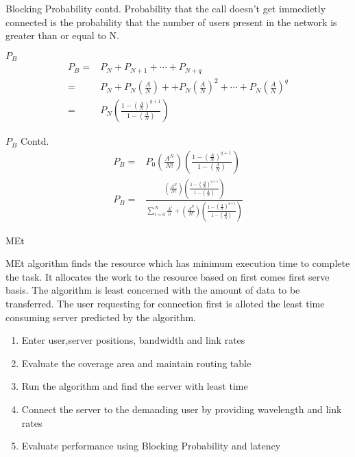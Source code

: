\documentclass{beamer}
\providecommand{\brak}[1]{\ensuremath{\left(#1\right)}}
\begin{document}
\begin{frame}{Blocking Probability contd.}
  Probability that the call doesn't get immedietly connected is the probability that
  the number of users present in the network is greater than or equal to N.
  \begin{block}{$P_B$}
    \begin{align}
      P_B = & P_N + P_{N+1} + \cdots +P_{N+q}                                                              \\[0.2cm]
      =     & P_N + P_N \brak{\frac{A}{N}} + + P_N \brak{\frac{A}{N}}^2 +\cdots + P_N \brak{\frac{A}{N}}^q \\[0.2cm]
      =     & P_N\brak{\frac{1-\brak{\frac{A}{N}}^{q+1}}{1-\brak{\frac{A}{N}}}}
    \end{align}
  \end{block}
\end{frame}
\begin{frame}
  \begin{block}{$P_B$ Contd.}
    \begin{align}
      P_B = & P_0 \brak{\frac{A^N}{N!}} \brak{\frac{1-\brak{\frac{A}{N}}^{q+1}}{1-\brak{\frac{A}{N}}}}                                                                                                                            \\[0.3cm]
      P_B = & \frac{\brak{\frac{A^N}{N!}} \brak{\frac{1-\brak{\frac{A}{N}}^{q+1}}{1-\brak{\frac{A}{N}}}}}{\sum_{i = 0}^{N} \frac{A^i}{i!} + \brak{\frac{A^N}{N!}} \brak{\frac{1-\brak{\frac{A}{N}}^{q+1}}{1-\brak{\frac{A}{N}}}}}
    \end{align}
  \end{block}
\end{frame}
\begin{frame}{MEt}
  \begin{block}{}
    MEt algorithm finds the resource which has minimum execution time to complete the task.
    It allocates the work to the resource based on first comes first serve basis.
    The algorithm is least concerned with the amount of data to be transferred.
    The user requesting for connection first is alloted the least time consuming server predicted by the algorithm.
  \end{block}
  \begin{enumerate}
    \item Enter user,server positions, bandwidth and link rates
    \item Evaluate the coverage area and maintain routing table
    \item Run the algorithm and find the server with least time
    \item Connect the server to the demanding user by providing wavelength and link rates
    \item Evaluate performance using Blocking Probability and latency
  \end{enumerate}
\end{frame}
\end{document}
